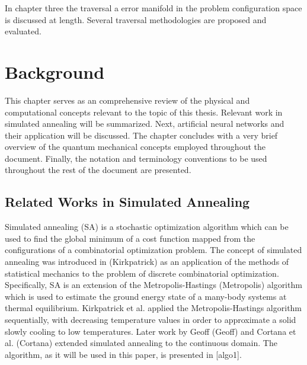 \documentclass[11pt]{afthesis}
\begin{document}

In chapter three the traversal a error manifold in the problem configuration space is discussed at length. Several traversal methodologies are proposed and evaluated. 



\chapter{Background} %



This chapter serves as an comprehensive review of the physical and computational concepts relevant to the topic of this thesis. Relevant work in simulated annealing will be summarized. Next, artificial neural networks and their application will be discussed. The chapter concludes with a very brief overview of the quantum mechanical concepts employed throughout the document. Finally, the notation and terminology conventions to be used throughout the rest of the document are presented.

\section{Related Works in Simulated Annealing}


Simulated annealing (SA) is a stochastic optimization algorithm which can be used to find the global minimum of a cost function mapped from the configurations of a combinatorial optimization problem. The concept of simulated annealing was introduced in (Kirkpatrick) as an application of the methods of statistical mechanics to the problem of discrete combinatorial optimization. Specifically, SA is an extension of the Metropolis-Hastings (Metropolis) algorithm which is used to estimate the ground energy state of a many-body systems at thermal equilibrium. Kirkpatrick et al. applied the Metropolis-Hastings algorithm sequentially, with decreasing temperature values in order to approximate a solid slowly cooling to low temperatures. Later work by Geoff (Geoff) and Cortana et al. (Cortana) extended simulated annealing to the continuous domain. The algorithm, as it will be used in this paper, is presented in [algo1]. 
\end{document}
